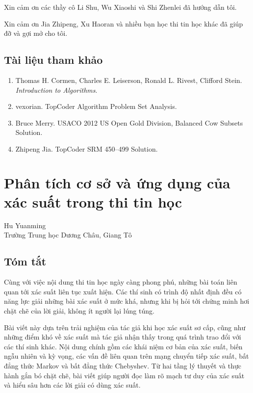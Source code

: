 \documentclass[11pt]{article}
\begin{document}
Xin cảm ơn các thầy cô Li Shu, Wu Xiaoshi và Shi Zhenlei đã hướng dẫn tôi.

Xin cảm ơn Jia Zhipeng, Xu Haoran và nhiều bạn học thi tin học khác đã giúp
đỡ và gợi mở cho tôi.

\subsection{Tài liệu tham khảo}

\begin{enumerate}
  \item Thomas H. Cormen, Charles E. Leiserson, Ronald L. Rivest, Clifford
  Stein. \emph{Introduction to Algorithms}.
  \item vexorian. TopCoder Algorithm Problem Set Analysis.
  \item Bruce Merry. USACO 2012 US Open Gold Division, Balanced Cow Subsets
  Solution.
  \item Zhipeng Jia. TopCoder SRM 450--499 Solution.
\end{enumerate}

\section{Phân tích cơ sở và ứng dụng của xác suất trong thi tin học}

\begin{center}
Hu Yuanming\\
Trường Trung học Dương Châu, Giang Tô
\end{center}

\subsection*{Tóm tắt}

Cùng với việc nội dung thi tin học ngày càng phong phú, những bài toán liên
quan tới xác suất liên tục xuất hiện. Các thí sinh có trình độ nhất định đều
có năng lực giải những bài xác suất ở mức khá, nhưng khi bị hỏi tới chứng
minh hơi chặt chẽ của lời giải, không ít người lại lúng túng.

Bài viết này dựa trên trải nghiệm của tác giả khi học xác suất sơ cấp, cũng
như những điểm khó về xác suất mà tác giả nhận thấy trong quá trình trao đổi
với các thí sinh khác. Nội dung chính gồm các khái niệm cơ bản của xác suất,
biến ngẫu nhiên và kỳ vọng, các vấn đề liên quan trên mạng chuyển tiếp xác
suất, bất đẳng thức Markov và bất đẳng thức Chebyshev. Từ hai tầng lý thuyết
và thực hành gắn bó chặt chẽ, bài viết giúp người đọc làm rõ mạch tư duy của
xác suất và hiểu sâu hơn các lời giải có dùng xác suất.
\end{document}
